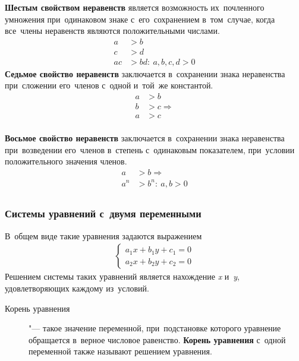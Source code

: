\documentclass[]{scrartcl}
\begin{document}
\textbf{Шестым свойством неравенств} является возможность их~почленного умножения при~одинаковом знаке с~его~сохранением в~том~случае, когда все~члены неравенств являются положительными числами.
\begin{equation}\label{eq:enequalities-property6}
\begin{aligned}
a&>b \\
c&>d \\
ac&>bd:\ a,b,c,d>0
\end{aligned}
\end{equation}
\textbf{Седьмое свойство неравенств} заключается в~сохранении знака неравенства при~сложении его~членов с~одной и~той~же константой.
\begin{equation}\label{eq:enequalities-property7}
\begin{aligned}
a&>b \\
b&>c \Rightarrow \\
a&>c\\
\end{aligned}
\end{equation}

\textbf{Восьмое свойство неравенств} заключается в~сохранении знака неравенства при~возведении его~членов в~степень с~одинаковым показателем, при~условии положительного значения членов.
\begin{equation}\label{eq:enequalities-property8}
\begin{aligned}
a&>b \Rightarrow\\
a^n&>b^n:\ a,b>0\\
\end{aligned}
\end{equation}

\subsubsection{Системы уравнений с~двумя переменными}

В~общем виде такие уравнения задаются выражением
\begin{equation}\label{eq:systems-linear-equations}
\begin{aligned}
\begin{cases}
a_{1}x+b_{1}y+c_{1}=0\\
a_{2}x+b_{2}y+c_{2}=0
\end{cases}
\end{aligned}
\end{equation}
Решением системы таких уравнений является нахождение \textit{x} и~\textit{y}, удовлетворяющих каждому из~условий. 
\begin{description}
	\item[Корень уравнения] "--- такое значение переменной, при~подстановке которого уравнение обращается в~верное числовое равенство. \textbf{Корень уравнения} с~одной переменной также называют решением уравнения.
\end{description}
\end{document}
